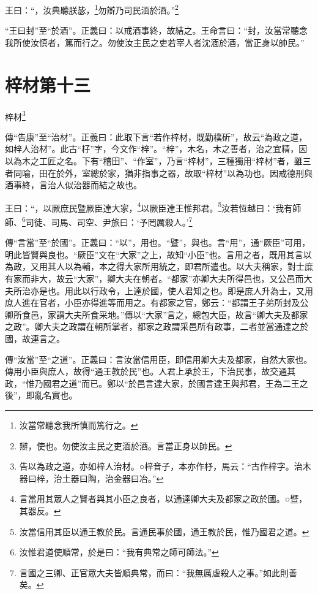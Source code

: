 王曰：“，汝典聽朕毖，\footnote{汝當常聽念我所慎而篤行之。}勿辯乃司民湎於酒。”\footnote{辯，使也。勿使汝主民之吏湎於酒。言當正身以帥民。}

{\noindent\shu{}\fzkt “王曰封”至“於酒”。正義曰：以戒酒事終，故結之。王命言曰：“封，汝當常聽念我所使汝慎者，篤而行之。勿使汝主民之吏若宰人者沈湎於酒，當正身以帥民。” \par}

\section{梓材第十三}


梓材\footnote{告以為政之道，亦如梓人治材。○梓音子，本亦作杼，馬云：“古作梓字。治木器曰梓，治土器曰陶，治金器曰冶。”}

{\noindent\shu{}\fzkt 傳“告康”至“治材”。正義曰：此取下言“若作梓材，既勤樸斫”，故云“為政之道，如梓人治材”。此古“杍”字，今文作“梓”。“梓”，木名，木之善者，治之宜精，因以為木之工匠之名。下有“稽田”、“作室”，乃言“梓材”，三種獨用“梓材”者，雖三者同喻，田在於外，室總於家，猶非指事之器，故取“梓材”以為功也。因戒德刑與酒事終，言治人似治器而結之故也。 \par}

王曰：“，以厥庶民暨厥臣達大家，\footnote{言當用其眾人之賢者與其小臣之良者，以通達卿大夫及都家之政於國。○暨，其器反。}以厥臣達王惟邦君。\footnote{汝當信用其臣以通王教於民。言通民事於國，通王教於民，惟乃國君之道。}汝若恆越曰：‘我有師師、\footnote{汝惟君道使順常，於是曰：“我有典常之師可師法。”}司徒、司馬、司空、尹旅曰：‘予罔厲殺人。’\footnote{言國之三卿、正官眾大夫皆順典常，而曰：“我無厲虐殺人之事。”如此則善矣。}


{\noindent\zhuan{}\fzbyks 傳“言當”至“於國”。正義曰：“以”，用也。“暨”，與也。言“用”，通“厥臣”可用，明此皆賢與良也。“厥臣”文在“大家”之上，故知“小臣”也。言用之者，既用其言以為政，又用其人以為輔，本之得大家所用統之，即君所遣也。以大夫稱家，對士庶有家而非大，故云“大家”，卿大夫在朝者。“都家”亦卿大夫所得邑也，又公邑而大夫所治亦是也。用此以行政令，上達於國，使人君知之也。即是庶人升為士，又用庶人進在官者，小臣亦得進等而用之。有都家之官，鄭云：“都謂王子弟所封及公卿所食邑，家謂大夫所食采地。”傳以“大家”言之，總包大臣，故言“卿大夫及都家之政”。卿大夫之政謂在朝所掌者，都家之政謂采邑所有政事，二者並當通達之於國，故連言之。 \par}

{\noindent\zhuan{}\fzbyks 傳“汝當”至“之道”。正義曰：言汝當信用臣，即信用卿大夫及都家，自然大家也。傳用小臣與庶人，故得“通王教於民”也。人君上承於王，下治民事，故交通其政，“惟乃國君之道”而已。鄭以“於邑言達大家，於國言達王與邦君，王為二王之後”，即亂名實也。 \par}


